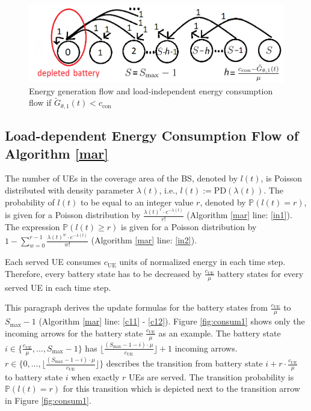 \begin{figure}[H]
	\centering
		\includegraphics[scale=0.6]{pictures/EN}
	\caption{Energy generation flow and load-independent energy consumption flow if $\tilde{G}_{\theta,1}(t)<c_{\mathrm{con}}$\label{fig:gener2}}
\end{figure}




\subsection{Load-dependent Energy Consumption Flow of Algorithm \ref{mar}}
The number of UEs in the coverage area of the BS, denoted by $l(t)$, is Poisson distributed with density parameter $\lambda(t)$, i.e., $l(t):= \mathrm{PD}(\lambda(t))$. The probability of $l(t)$ to be equal to an integer value $r$, denoted by $\mathbb{P}(l(t)=r)$, is given for a Poisson distribution by $\frac{\lambda(t)^r \cdot e^{-\lambda(t)}}{r!}$ \cite{poisson_formula} (Algorithm \ref{mar} line: \ref{in1}). The expression $\mathbb{P}(l(t)\geq r)$ is given for a Poisson distribution by $1 - \sum_{w=0}^{r-1}\frac{\lambda(t)^w\cdot e^{-\lambda(t)}}{w!}$ \cite{poisson_formula} (Algorithm \ref{mar} line: \ref{in2}).

Each served UE consumes $c_{\mathrm{UE}}$ units of normalized energy in each time step. Therefore, every battery state has to be decreased by $\frac{c_{\mathrm{UE}}}{\mu}$ battery states for every served UE in each time step.

This paragraph derives the update formulas for the battery states from $\frac{c_{\mathrm{UE}}}{\mu}$ to $S_{\max}-1$ (Algorithm \ref{mar} line: \ref{c11} - \ref{c12}). Figure \ref{fig:consum1} shows only the incoming arrows for the battery state $\frac{c_{\mathrm{UE}}}{\mu}$ as an example. The battery state $i \in \{\frac{c_{\mathrm{UE}}}{\mu},...,S_{\max}-1\}$ has $\Big\lfloor \frac{(S_{\max}-1-i)\cdot\mu}{c_{\mathrm{UE}}} \Big\rfloor + 1 $ incoming arrows. $r \in \big\{0,...,\Big\lfloor\frac{(S_{\max}-1-i)\cdot\mu}{c_{\mathrm{UE}}}\Big\rfloor\big\}$ describes the transition from battery state $i+r \cdot \frac{c_{\mathrm{UE}}}{\mu}$ to battery state $i$ when exactly $r$ UEs are served. The transition probability is $\mathbb{P}(l(t)=r) $ for this transition which is depicted next to the transition arrow in Figure \ref{fig:consum1}.

